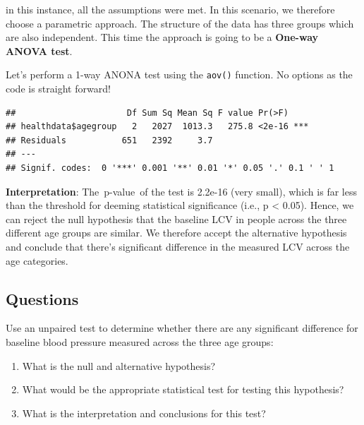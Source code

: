 \documentclass[
]{book}
\newenvironment{Shaded}{\begin{snugshade}}{\end{snugshade}}
\newcommand{\CommentTok}[1]{\textcolor[rgb]{0.56,0.35,0.01}{\textit{#1}}}
\newcommand{\FunctionTok}[1]{\textcolor[rgb]{0.00,0.00,0.00}{#1}}
\newcommand{\NormalTok}[1]{#1}
\newcommand{\SpecialCharTok}[1]{\textcolor[rgb]{0.00,0.00,0.00}{#1}}
\begin{document}
in this instance, all the assumptions were met. In this scenario, we therefore choose a parametric approach. The structure of the data has three groups which are also independent. This time the approach is going to be a \textbf{One-way ANOVA test}.

Let's perform a 1-way ANONA test using the \texttt{aov()} function. No options as the code is straight forward!

\begin{Shaded}
\end{Shaded}

\begin{verbatim}
##                      Df Sum Sq Mean Sq F value Pr(>F)    
## healthdata$agegroup   2   2027  1013.3   275.8 <2e-16 ***
## Residuals           651   2392     3.7                   
## ---
## Signif. codes:  0 '***' 0.001 '**' 0.01 '*' 0.05 '.' 0.1 ' ' 1
\end{verbatim}

\textbf{Interpretation}: The~p-value~of the test is 2.2e-16 (very small), which is far less than the threshold for deeming statistical significance (i.e., p \textless{} 0.05). Hence, we can reject the null hypothesis that the baseline LCV in people across the three different age groups are similar. We therefore accept the alternative hypothesis and conclude that there's significant difference in the measured LCV across the age categories.

\hypertarget{questions-2}{%
\subsection{Questions}\label{questions-2}}

Use an unpaired test to determine whether there are any significant difference for baseline blood pressure measured across the three age groups:

\begin{enumerate}
\def\labelenumi{\arabic{enumi}.}
\item
  What is the null and alternative hypothesis?
\item
  What would be the appropriate statistical test for testing this hypothesis?
\item
  What is the interpretation and conclusions for this test?
\end{enumerate}
\end{document}
